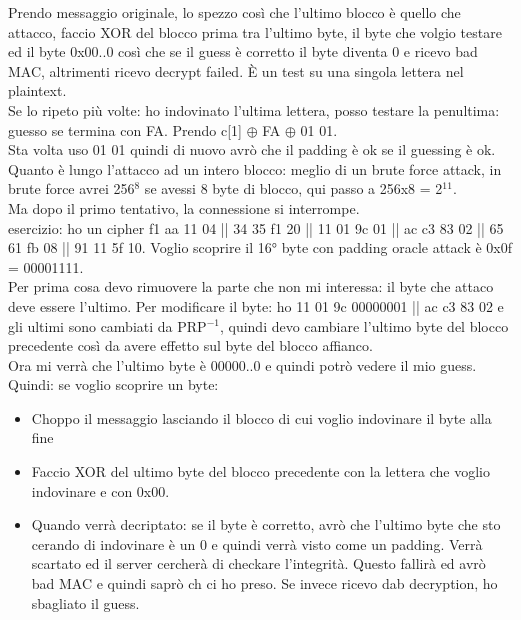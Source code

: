 \documentclass[16px]{article}
\begin{document}
Prendo messaggio originale, lo spezzo così che l'ultimo blocco è quello che attacco, faccio XOR del blocco prima tra l'ultimo byte, il byte che volgio testare ed il byte 0x00..0 così che se il guess è corretto il byte diventa 0 e ricevo bad MAC, altrimenti ricevo decrypt failed. È un test su una singola lettera nel plaintext.\\ Se lo ripeto più volte: ho indovinato l'ultima lettera, posso testare la penultima: guesso se termina con FA. Prendo c[1] $\oplus$ FA $\oplus$ 01 01.\\ Sta volta uso 01 01 quindi di nuovo avrò che il padding è ok se il guessing è ok.\\ Quanto è lungo l'attacco ad un intero blocco: meglio di un brute force attack, in brute force avrei 256$^8$ se avessi 8 byte di blocco, qui passo a 256x8 = 2$^{11}$.\\ Ma dopo il primo tentativo, la connessione si interrompe.\\ esercizio: ho un cipher f1 aa 11 04 || 34 35 f1 20 || 11 01 9c 01 || ac c3 83 02 || 65 61 fb 08 || 91 11 5f 10. Voglio scoprire il 16° byte  con padding oracle attack è 0x0f = 00001111.\\Per prima cosa devo rimuovere la parte che non mi interessa: il byte che attaco deve essere l'ultimo. Per modificare il byte: ho 11 01 9c 00000001 || ac c3 83 02 e gli ultimi sono cambiati da PRP$^{-1}$, quindi devo cambiare l'ultimo byte del blocco precedente così da avere effetto sul byte del blocco affianco.\\ Ora mi verrà che l'ultimo byte è 00000..0 e quindi potrò vedere il mio guess.\\ Quindi: se voglio scoprire un byte:
\begin{itemize}
\item Choppo il messaggio lasciando il blocco di cui voglio indovinare il byte alla fine
\item Faccio XOR del ultimo byte del blocco precedente con la lettera che voglio indovinare e con 0x00.
\item Quando verrà decriptato: se il byte è corretto, avrò che l'ultimo byte che sto cerando di indovinare è un 0 e quindi verrà visto come un padding. Verrà scartato ed il server cercherà di checkare l'integrità. Questo fallirà ed avrò bad MAC e quindi saprò ch ci ho preso. Se invece ricevo dab decryption, ho sbagliato il guess.
\end{itemize}
\end{document}
